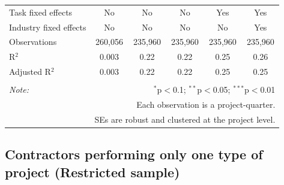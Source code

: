 \documentclass[
]{article}
\begin{document}
\begin{table}[H]
\begin{tabular}{@{\extracolsep{-2pt}}lccccc}
Task fixed effects & No & No & No & Yes & Yes \\ 
Industry fixed effects & No & No & No & No & Yes \\ 
Observations & 260,056 & 235,960 & 235,960 & 235,960 & 235,960 \\ 
R$^{2}$ & 0.003 & 0.22 & 0.22 & 0.25 & 0.26 \\ 
Adjusted R$^{2}$ & 0.003 & 0.22 & 0.22 & 0.25 & 0.25 \\ 
\hline 
\hline \\[-1.8ex] 
\textit{Note:}  & \multicolumn{5}{r}{$^{*}$p$<$0.1; $^{**}$p$<$0.05; $^{***}$p$<$0.01} \\ 
 & \multicolumn{5}{r}{Each observation is a project-quarter.} \\ 
 & \multicolumn{5}{r}{SEs are robust and clustered at the project level.} \\ 
\end{tabular} 
\end{table}

\hypertarget{contractors-performing-only-one-type-of-project-restricted-sample}{%
\subsection{Contractors performing only one type of project (Restricted
sample)}\label{contractors-performing-only-one-type-of-project-restricted-sample}}
\end{document}
